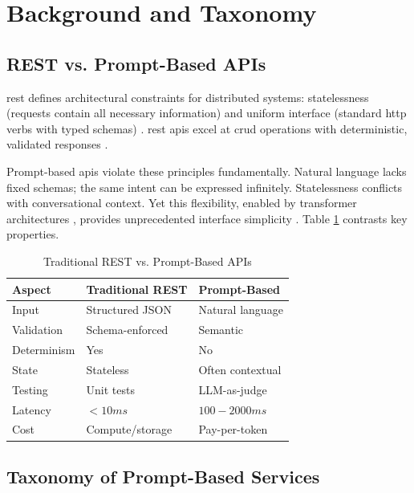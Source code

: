 \section{Background and Taxonomy}

\subsection{REST vs. Prompt-Based APIs}

\gls{rest} defines architectural constraints for distributed systems: statelessness (requests contain all necessary information) and uniform interface (standard \gls{http} verbs with typed schemas) \cite{fielding_architectural_2000}. \gls{rest} \gls{api}s excel at \gls{crud} operations with deterministic, validated responses \cite{richardson_restful_2007}.

Prompt-based \gls{api}s violate these principles fundamentally. Natural language lacks fixed schemas; the same intent can be expressed infinitely. Statelessness conflicts with conversational context. Yet this flexibility, enabled by transformer architectures \cite{vaswani_attention_2017}, provides unprecedented interface simplicity \cite{brown_language_2020}. Table \ref{tab:api_comparison} contrasts key properties.

\begin{table}[h]
\centering
\caption{Traditional REST vs. Prompt-Based APIs}
\label{tab:api_comparison}
\small
\begin{tabular}{|p{2.2cm}|p{2.5cm}|p{2.5cm}|}
\hline
\textbf{Aspect} & \textbf{Traditional REST} & \textbf{Prompt-Based} \\
\hline
Input & Structured JSON & Natural language \\
\hline
Validation & Schema-enforced & Semantic \\
\hline
Determinism & Yes & No \\
\hline
State & Stateless & Often contextual \\
\hline
Testing & Unit tests & LLM-as-judge \\
\hline
Latency & $<10ms$ & $100-2000ms$ \\
\hline
Cost & Compute/storage & Pay-per-token \\
\hline
\end{tabular}
\end{table}

\subsection{Taxonomy of Prompt-Based Services}

